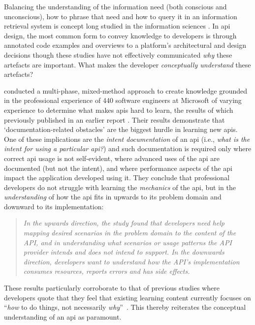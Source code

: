 Balancing the understanding of the information need (both conscious and unconscious), how to phrase that need and how to query it in an information retrieval system is concept long studied in the information sciences \citep{Taylor:1968tq}. In \gls{api} design, the most common form to convey knowledge to developers is through annotated code examples and overviews to a platform's architectural and design decisions \citep{Myers:2010wt,Robillard:2011uv,Dorn:2010wl,Brandt:2009tm} though these studies have not effectively communicated \textit{why} these artefacts are important. What makes the developer \textit{conceptually understand} these artefacts?

\citet{Robillard:2011uv} conducted a multi-phase, mixed-method approach to create knowledge grounded in the professional experience of 440 software engineers at Microsoft of varying experience to determine what makes \glspl{api} hard to learn, the results of which previously published in an earlier report \citep{Robillard:2009uk}. Their results demonstrate that `documentation-related obstacles' are the biggest hurdle in learning new \glspl{api}. One of these implications are the \textit{intent documentation} of an \gls{api} (i.e., \textit{what is the intent for using a particular \gls{api}?}) and such documentation is required only where correct \gls{api} usage is not self-evident, where advanced uses of the \gls{api} are documented (but not the intent), and where performance aspects of the \gls{api} impact the application developed using it. They conclude that professional developers do not struggle with learning the \textit{mechanics} of the \gls{api}, but in the \textit{understanding} of how the \gls{api} fits in upwards to its problem domain and downward to its implementation:

\begin{quote}
  \itshape
  In the \textup{upwards} direction, the study found that developers need help mapping desired scenarios in the problem domain to the content of the API, and in understanding what scenarios or usage patterns the API provider intends and does not intend to support. In the \textup{downwards} direction, developers want to understand how the API's implementation consumes resources, reports errors and has side effects. 
  \upshape
  \citep{Robillard:2011uv}
\end{quote}


These results particularly corroborate to that of previous studies where developers quote that they feel that existing learning content currently focuses on ``\textit{how} to do things, not necessarily \textit{why}''~\citep{Nykaza:2002td}. This thereby reiterates the conceptual understanding of an \gls{api} as paramount.

